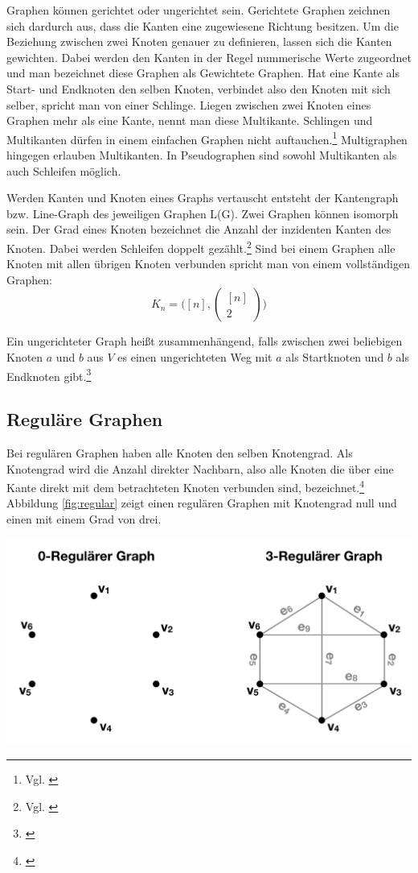 Graphen können gerichtet oder ungerichtet sein.
Gerichtete Graphen zeichnen sich dardurch aus, dass die Kanten eine zugewiesene Richtung besitzen.
Um die Beziehung zwischen zwei Knoten genauer zu definieren, lassen sich die Kanten gewichten.
Dabei werden den Kanten in der Regel nummerische Werte zugeordnet und man bezeichnet diese Graphen als Gewichtete Graphen.
Hat eine Kante als Start- und Endknoten den selben Knoten, verbindet also den Knoten mit sich selber, spricht man von einer Schlinge.
Liegen zwischen zwei Knoten eines Graphen mehr als eine Kante, nennt man diese Multikante.
Schlingen und Multikanten dürfen in einem einfachen Graphen nicht auftauchen.\footnote{Vgl. \cite{felsner01}}
Multigraphen hingegen erlauben Multikanten. In Pseudographen sind sowohl Multikanten als auch Schleifen möglich.

Werden Kanten und Knoten eines Graphs vertauscht entsteht der Kantengraph bzw. Line-Graph des jeweiligen Graphen L(G).
Zwei Graphen können isomorph sein.
Der Grad eines Knoten bezeichnet die Anzahl der inzidenten Kanten des Knoten.
Dabei werden Schleifen doppelt gezählt.\footnote{Vgl. \cite[Seite 13]{rahm2017}}
Sind bei einem Graphen alle Knoten mit allen übrigen Knoten verbunden spricht man von einem vollständigen Graphen:
	\[K_{n}=\big([n],\begin{pmatrix}
		[n] \\ 2
	\end{pmatrix}\big)\]

Ein ungerichteter Graph heißt zusammenhängend, falls zwischen zwei beliebigen Knoten $a$ und $b$ aus $V$ es einen ungerichteten Weg mit $a$ als Startknoten und $b$ als Endknoten gibt.\footnote{\cite[36-38]{krumke2012graphentheoretische}}

\subsection{Reguläre Graphen}
Bei regulären Graphen haben alle Knoten den selben Knotengrad.
Als Knotengrad wird die Anzahl direkter Nachbarn, also alle Knoten die über eine Kante direkt mit dem betrachteten Knoten verbunden sind, bezeichnet.\footnote{\cite{felsner2012geometric}}
Abbildung \ref{fig:regular} zeigt einen regulären Graphen mit Knotengrad null und einen mit einem Grad von drei.
\begin{center}
	\includegraphics[scale = 0.4]{./images/Regulaerer_graph.png}
	\label{fig:regular}
\end{center}
